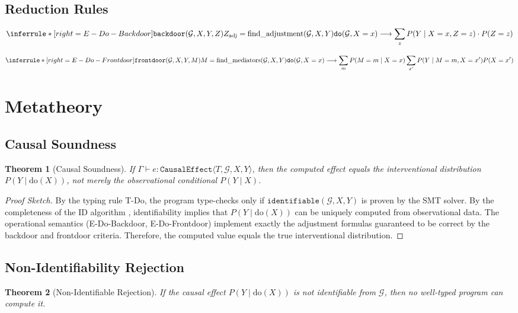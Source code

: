 \documentclass[11pt]{article}
\newtheorem{theorem}{Theorem}
\begin{document}
\subsection{Reduction Rules}

\[
\inferrule*[right=E-Do-Backdoor]
  {\texttt{backdoor}(\mathcal{G}, X, Y, Z) \\
   Z_{\text{adj}} = \text{find\_adjustment}(\mathcal{G}, X, Y)}
  {\texttt{do}(\mathcal{G}, X = x) \longrightarrow
   \sum_{z} P(Y \mid X = x, Z = z) \cdot P(Z = z)}
\]

\[
\inferrule*[right=E-Do-Frontdoor]
  {\texttt{frontdoor}(\mathcal{G}, X, Y, M) \\
   M = \text{find\_mediators}(\mathcal{G}, X, Y)}
  {\texttt{do}(\mathcal{G}, X = x) \longrightarrow
   \sum_{m} P(M = m \mid X = x) \sum_{x'} P(Y \mid M = m, X = x') P(X = x')}
\]

\section{Metatheory}

\subsection{Causal Soundness}
\begin{theorem}[Causal Soundness]
If $\Gamma \vdash e : \texttt{CausalEffect}\langle T, \mathcal{G}, X, Y \rangle$, then the computed effect equals the interventional distribution $P(Y \mid \text{do}(X))$, not merely the observational conditional $P(Y \mid X)$.
\end{theorem}

\begin{proof}[Proof Sketch]
By the typing rule T-Do, the program type-checks only if $\texttt{identifiable}(\mathcal{G}, X, Y)$ is proven by the SMT solver. By the completeness of the ID algorithm \cite{tian2002general}, identifiability implies that $P(Y \mid \text{do}(X))$ can be uniquely computed from observational data. The operational semantics (E-Do-Backdoor, E-Do-Frontdoor) implement exactly the adjustment formulas guaranteed to be correct by the backdoor and frontdoor criteria. Therefore, the computed value equals the true interventional distribution.
\end{proof}

\subsection{Non-Identifiability Rejection}
\begin{theorem}[Non-Identifiable Rejection]
If the causal effect $P(Y \mid \text{do}(X))$ is not identifiable from $\mathcal{G}$, then no well-typed program can compute it.
\end{theorem}
\end{document}
